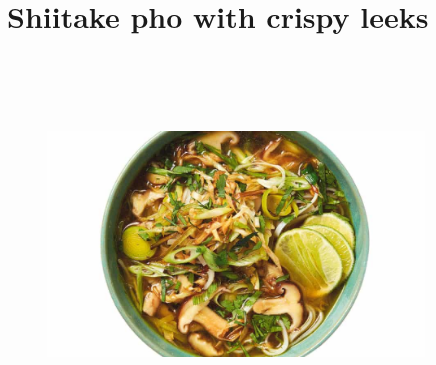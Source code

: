 \documentclass{book}
\begin{document}
\section{Shiitake pho with crispy leeks }
\begin{figure}
\centering\includegraphics[width=10cm,height=10cm,keepaspectratio]{Recipe_Pictures/Shiitake_pho_with_crispy_leeks_.png}
\end{figure}
\end{document}
